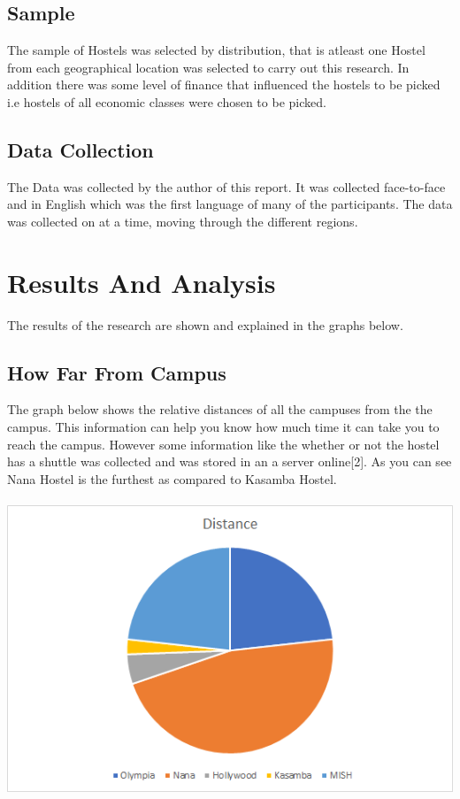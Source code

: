 \documentclass[12pt, a4paper]{article}
\begin{document}
\subsection{Sample}
The sample of Hostels was selected by distribution, that is atleast one Hostel from each geographical location was selected to carry out this research. In addition there was some level of finance that influenced the hostels to be picked i.e hostels of all economic classes were chosen to be picked.

\subsection{Data Collection}
The Data was collected by the author of this report. It was collected face-to-face and in English which was the first language of many of the participants. The data was collected on at a time, moving through the different regions.

\clearpage
\section{Results And Analysis}
The results of the research are shown and explained in the graphs below.

\subsection{How Far From Campus}
The graph below shows the relative distances of all the campuses from the the campus. This information can help you know how much time it can take you to reach the campus. However some information like the whether or not the hostel has a shuttle was collected and was stored in an a server online[2]. As you can see Nana Hostel is the furthest as compared to Kasamba Hostel.\\
\\
\includegraphics{Chart}
\end{document}
